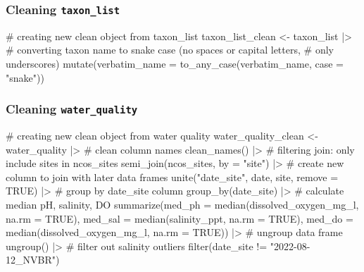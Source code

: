 \documentclass[
  letterpaper,
  DIV=11,
  numbers=noendperiod]{scrartcl}
\newenvironment{Shaded}{\begin{snugshade}}{\end{snugshade}}
\newcommand{\AttributeTok}[1]{\textcolor[rgb]{0.40,0.45,0.13}{#1}}
\newcommand{\CommentTok}[1]{\textcolor[rgb]{0.37,0.37,0.37}{#1}}
\newcommand{\ConstantTok}[1]{\textcolor[rgb]{0.56,0.35,0.01}{#1}}
\newcommand{\FunctionTok}[1]{\textcolor[rgb]{0.28,0.35,0.67}{#1}}
\newcommand{\NormalTok}[1]{\textcolor[rgb]{0.00,0.23,0.31}{#1}}
\newcommand{\OtherTok}[1]{\textcolor[rgb]{0.00,0.23,0.31}{#1}}
\newcommand{\SpecialCharTok}[1]{\textcolor[rgb]{0.37,0.37,0.37}{#1}}
\newcommand{\StringTok}[1]{\textcolor[rgb]{0.13,0.47,0.30}{#1}}
\begin{document}
\subsubsection{\texorpdfstring{Cleaning
\texttt{taxon\_list}}{Cleaning taxon\_list}}\label{cleaning-taxon_list}

\begin{Shaded}
\begin{Highlighting}[]
\CommentTok{\# creating new clean object from taxon\_list}
\NormalTok{taxon\_list\_clean }\OtherTok{\textless{}{-}}\NormalTok{ taxon\_list }\SpecialCharTok{|\textgreater{}} 
  \CommentTok{\# converting taxon name to snake case (no spaces or capital letters,}
  \CommentTok{\# only underscores)}
  \FunctionTok{mutate}\NormalTok{(}\AttributeTok{verbatim\_name =} \FunctionTok{to\_any\_case}\NormalTok{(verbatim\_name, }\AttributeTok{case =} \StringTok{"snake"}\NormalTok{))}
\end{Highlighting}
\end{Shaded}

\subsubsection{\texorpdfstring{Cleaning
\texttt{water\_quality}}{Cleaning water\_quality}}\label{cleaning-water_quality}

\begin{Shaded}
\begin{Highlighting}[]
\CommentTok{\# creating new clean object from water quality}
\NormalTok{water\_quality\_clean }\OtherTok{\textless{}{-}}\NormalTok{ water\_quality }\SpecialCharTok{|\textgreater{}} 
  \CommentTok{\# clean column names}
  \FunctionTok{clean\_names}\NormalTok{() }\SpecialCharTok{|\textgreater{}} 
  \CommentTok{\# filtering join: only include sites in ncos\_sites}
  \FunctionTok{semi\_join}\NormalTok{(ncos\_sites, }\AttributeTok{by =} \StringTok{"site"}\NormalTok{) }\SpecialCharTok{|\textgreater{}} 
  \CommentTok{\# create new column to join with later data frames}
  \FunctionTok{unite}\NormalTok{(}\StringTok{"date\_site"}\NormalTok{, date, site, }\AttributeTok{remove =} \ConstantTok{TRUE}\NormalTok{) }\SpecialCharTok{|\textgreater{}} 
  \CommentTok{\# group by date\_site column}
  \FunctionTok{group\_by}\NormalTok{(date\_site) }\SpecialCharTok{|\textgreater{}}
  \CommentTok{\# calculate median pH, salinity, DO}
  \FunctionTok{summarize}\NormalTok{(}\AttributeTok{med\_ph =} \FunctionTok{median}\NormalTok{(dissolved\_oxygen\_mg\_l, }\AttributeTok{na.rm =} \ConstantTok{TRUE}\NormalTok{),}
            \AttributeTok{med\_sal =} \FunctionTok{median}\NormalTok{(salinity\_ppt, }\AttributeTok{na.rm =} \ConstantTok{TRUE}\NormalTok{),}
            \AttributeTok{med\_do =} \FunctionTok{median}\NormalTok{(dissolved\_oxygen\_mg\_l, }\AttributeTok{na.rm =} \ConstantTok{TRUE}\NormalTok{)) }\SpecialCharTok{|\textgreater{}} 
  \CommentTok{\# ungroup data frame}
  \FunctionTok{ungroup}\NormalTok{() }\SpecialCharTok{|\textgreater{}} 
  \CommentTok{\# filter out salinity outliers}
  \FunctionTok{filter}\NormalTok{(date\_site }\SpecialCharTok{!=} \StringTok{"2022{-}08{-}12\_NVBR"}\NormalTok{) }
\end{Highlighting}
\end{Shaded}
\end{document}
